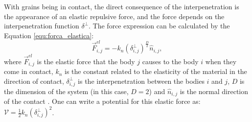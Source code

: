     With grains being in contact, the direct consequence of the interpenetration is the appearance of an elastic repulsive force, and the force depends on the interpenetration function $\delta^{\perp}$. The force expression can be calculated by the Equation \ref{equ:forca_elastica}: 
\begin{equation}
    \label{equ:forca_elastica}
    \vec{F}_{i,j}^{el} = -k_{n}\left(\delta_{i,j}^{\perp}\right)^{\frac{D}{2}}\hat{n}_{i,j},
\end{equation}
where $\vec{F}_{i,j}^{el}$ is the elastic force that the body $j$ causes to the body $i$ when they come in contact, $k_{n}$ is the constant related to the elasticity of the material in the direction of contact, $\delta_{i,j}^{\perp}$ is the interpenetration between the bodies $i$ and $j$, $D$ is the dimension of the system (in this case, $D=2$) and $\hat{n}_{i,j}$ is the normal direction of the contact \cite{Dissertacao, Caio-Tese, Landau}. One can write a potential for this elastic force as: $\mathcal{V} = \frac{1}{2}k_{n}\left({\delta_{i,j}^{\perp}}\right)^2$.

